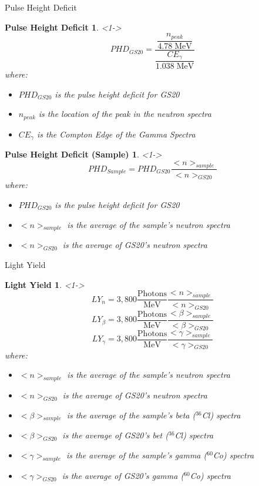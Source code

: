 \begin{frame}{Pulse Height Deficit}
	\newtheorem{thm5}{Pulse Height Deficit}
	\begin{thm5}<1->
	\tiny
	$$ PHD_{GS20} = \frac{\dfrac{n_{peak}}{4.78\;\text{MeV}}}{\dfrac{CE_\gamma}{1.038\;\text{MeV}}} $$
		where:
		\begin{itemize}
			\tiny
			\item $PHD_{GS20}$ is the pulse height deficit for GS20
			\item $n_{peak}$ is the location of the peak in the neutron spectra
			\item $CE_\gamma$ is the Compton Edge of the Gamma Spectra
		\end{itemize}
	\end{thm5}
	\newtheorem{thm6}{Pulse Height Deficit (Sample)}
	\begin{thm6}<1->
	\tiny
	$$ PHD_{Sample} = PHD_{GS20} \frac{<n>_{sample}}{<n>_{GS20}} $$
		where:
		\begin{itemize}
			\tiny
			\item $PHD_{GS20}$ is the pulse height deficit for GS20
			\item $<n>_{sample}$ is the average of the sample's neutron spectra
			\item $<n>_{GS20}$ is the average of GS20's neutron spectra
		\end{itemize}
	\end{thm6}
\end{frame}
\begin{frame}{Light Yield}
	\newtheorem{thm7}{Light Yield}
	\begin{thm7}<1->
	\tiny
	$$ LY_{n} = 3,800 \frac{\text{Photons}}{\text{MeV}}\frac{<n>_{sample}}{<n>_{GS20}} $$
	$$ LY_{\beta} = 3,800 \frac{\text{Photons}}{\text{MeV}}\frac{<\beta>_{sample}}{<\beta>_{GS20}} $$
	$$ LY_{\gamma} = 3,800 \frac{\text{Photons}}{\text{MeV}}\frac{<\gamma>_{sample}}{<\gamma>_{GS20}} $$
		where:
		\begin{itemize}
			\tiny
			\item $<n>_{sample}$ is the average of the sample's neutron spectra
			\item $<n>_{GS20}$ is the average of GS20's neutron spectra
			\item $<\beta>_{sample}$ is the average of the sample's beta (${}^{36}$Cl) spectra
			\item $<\beta>_{GS20}$ is the average of GS20's bet (${}^{36}$Cl) spectra
			\item $<\gamma>_{sample}$ is the average of the sample's gamma (${}^{60}$Co) spectra
			\item $<\gamma>_{GS20}$ is the average of GS20's gamma (${}^{60}$Co) spectra
		\end{itemize}
	\end{thm7}
\end{frame}
